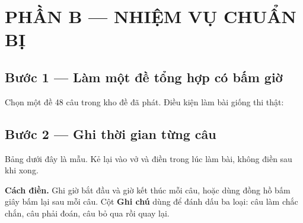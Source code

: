 \documentclass[11pt, a4paper]{article}
\begin{document}
\section{PHẦN B — NHIỆM VỤ CHUẨN BỊ}

\subsection{Bước 1 — Làm một đề tổng hợp có bấm giờ}

Chọn một đề 48 câu trong kho đề đã phát. Điều kiện làm bài giống thi thật:


\subsection{Bước 2 — Ghi thời gian từng câu}

Bảng dưới đây là mẫu. Kẻ lại vào vở và điền trong lúc làm bài, không điền sau khi xong.


\textbf{Cách điền.} Ghi giờ bắt đầu và giờ kết thúc mỗi câu, hoặc dùng đồng hồ bấm giây bấm lại sau mỗi câu. Cột \textbf{Ghi chú} dùng để đánh dấu ba loại: câu làm chắc chắn, câu phải đoán, câu bỏ qua rồi quay lại.
\end{document}
